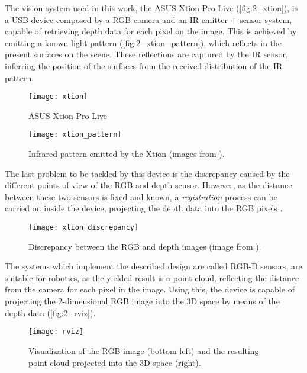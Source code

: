 The vision system used in this work, the ASUS Xtion Pro Live (\autoref{fig:2_xtion}), is a USB device composed by a RGB camera and an IR emitter + sensor system, capable of retrieving depth data for each pixel on the image. This is achieved by emitting a known light pattern (\autoref{fig:2_xtion_pattern}), which reflects in the present surfaces on the scene. These reflections are captured by the IR sensor, inferring the position of the surfaces from the received distribution of the IR pattern.

\begin{figure}[h]
	\centering
	\texttt{[image: xtion]}
	\caption{ASUS Xtion Pro Live}
	\label{fig:2_xtion}
\end{figure}

\begin{figure}[h]
	\centering
	\texttt{[image: xtion\_pattern]}
	\caption{Infrared pattern emitted by the Xtion (images from \cite{rgbd_poses}).}
	\label{fig:2_xtion_pattern}
\end{figure}

The last problem to be tackled by this device is the discrepancy caused by the different points of view of the RGB and depth sensor. However, as the distance between these two sensors is fixed and known, a \textit{registration} process can be carried on inside the device, projecting the depth data into the RGB pixels \cite{diapos_cv_registration}.\\

\begin{figure}[h]
	\centering
	\texttt{[image: xtion\_discrepancy]}
	\caption{Discrepancy between the RGB and depth images (image from \cite{tfg}).}
	\label{fig:2_xtion_discrepancy}
\end{figure}

The systems which implement the described design are called RGB-D sensors, are suitable for robotics, as the yielded result is a point cloud, reflecting the distance from the camera for each pixel in the image. Using this, the device is capable of projecting the 2-dimensional RGB image into the 3D space by means of the depth data (\autoref{fig:2_rviz}).\\

\begin{figure}[h]
	\centering
	\texttt{[image: rviz]}
	\caption{Visualization of the RGB image (bottom left) and the resulting point cloud projected into the 3D space (right).}
	\label{fig:2_rviz}
	
\end{figure}


